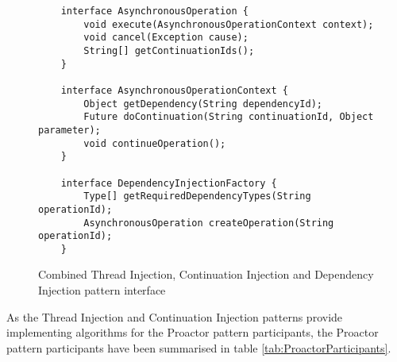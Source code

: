 \documentclass[prodmode]{style/acmlarge}
\begin{document}
\begin{figure}[tp]
\centering
\begin{verbatim}
    interface AsynchronousOperation {
        void execute(AsynchronousOperationContext context);
        void cancel(Exception cause);
        String[] getContinuationIds();
    }

    interface AsynchronousOperationContext {
        Object getDependency(String dependencyId);
        Future doContinuation(String continuationId, Object parameter);
        void continueOperation();
    }
    
    interface DependencyInjectionFactory {
        Type[] getRequiredDependencyTypes(String operationId);
        AsynchronousOperation createOperation(String operationId);
    }
\end{verbatim}
\caption{Combined Thread Injection, Continuation Injection and Dependency Injection pattern interface\footnotemark}
\label{fig:InjectionInterfaces}
\end{figure}

As the Thread Injection and Continuation Injection patterns provide implementing
algorithms for the Proactor pattern participants, the Proactor pattern
participants have been summarised in table \ref{tab:ProactorParticipants}.

\begin{table}[t]
\label{tab:ProactorParticipants}
\end{table}
\end{document}
